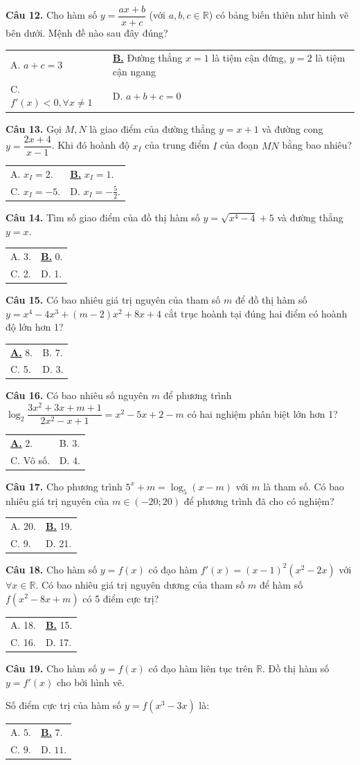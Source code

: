 \documentclass[12pt,a4paper]{article}
\makeatletter
\newcommand{\choiceA}[4]{
    \par\vspace{0.5em}\noindent
    \begin{tabularx}{\textwidth}{@{}X X@{}}
    \underline{\textbf{A.}} #1 & B. #2 \\[
1.2em]
    C. #3 & D. #4
    \end{tabularx}
}
\newcommand{\choiceB}[4]{
    \par\vspace{0.5em}\noindent
    \begin{tabularx}{\textwidth}{@{}X X@{}}
    A. #1 & \underline{\textbf{B.}} #2 \\[1.2em]
    C. #3 & D. #4
    \end{tabularx}
}
\makeatother
\begin{document}
\textbf{Câu 12.} Cho hàm số $y = \dfrac{ax+b}{x+c}$ (với $a, b, c \in \mathbb{R}$) có bảng biến thiên như hình vẽ bên dưới. Mệnh đề nào sau đây đúng?
\begin{center}
\end{center}
\choiceB{$a + c = 3$}{Đường thẳng $x = 1$ là tiệm cận đứng, $y = 2$ là tiệm cận ngang}{$f'(x) < 0, \forall x \neq 1$}{$a + b + c = 0$}

\textbf{Câu 13.} Gọi $M, N$ là giao điểm của đường thẳng $y=x+1$ và đường cong $y=\dfrac{2x+4}{x-1}$. Khi đó hoành độ $x_I$ của trung điểm $I$ của đoạn $MN$ bằng bao nhiêu?
\choiceB{$x_I = 2$.}{$x_I = 1$.}{$x_I = -5$.}{$x_I = -\frac{5}{2}$.}

\textbf{Câu 14.} Tìm số giao điểm của đồ thị hàm số $y=\sqrt{x^4-4}+5$ và đường thẳng $y=x$.
\choiceB{3.}{0.}{2.}{1.}

\textbf{Câu 15.} Có bao nhiêu giá trị nguyên của tham số $m$ để đồ thị hàm số $y=x^4-4x^3+(m-2)x^2+8x+4$ cắt trục hoành tại đúng hai điểm có hoành độ lớn hơn 1?
\choiceA{8.}{7.}{5.}{3.}

\textbf{Câu 16.} Có bao nhiêu số nguyên $m$ để phương trình $\log_2\dfrac{3x^2+3x+m+1}{2x^2-x+1} = x^2-5x+2-m$ có hai nghiệm phân biệt lớn hơn 1?
\choiceA{2.}{3.}{Vô số.}{4.}

\textbf{Câu 17.} Cho phương trình $5^x+m=\log_5(x-m)$ với $m$ là tham số. Có bao nhiêu giá trị nguyên của $m \in (-20; 20)$ để phương trình đã cho có nghiệm?
\choiceB{20.}{19.}{9.}{21.}

\textbf{Câu 18.} Cho hàm số $y=f(x)$ có đạo hàm $f'(x)=(x-1)^2(x^2-2x)$ với $\forall x \in \mathbb{R}$. Có bao nhiêu giá trị nguyên dương của tham số $m$ để hàm số $f(x^2-8x+m)$ có 5 điểm cực trị?
\choiceB{18.}{15.}{16.}{17.}

\textbf{Câu 19.} Cho hàm số $y = f(x)$ có đạo hàm liên tục trên $\mathbb{R}$. Đồ thị hàm số $y = f'(x)$ cho bởi hình vẽ.
\begin{center}
\end{center}
Số điểm cực trị của hàm số $y = f(x^3 - 3x)$ là:
\choiceB{$5$.}{$7$.}{$9$.}{$11$.}
\end{document}
